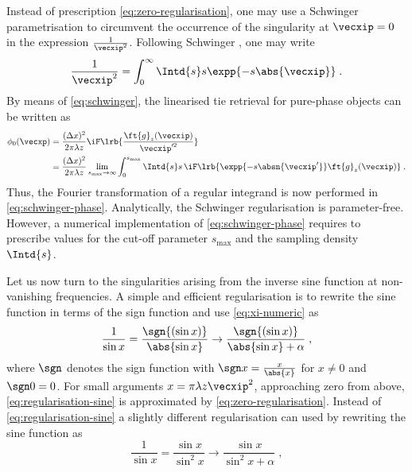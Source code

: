 \documentclass[
twoside,
openright,
titlepage,
numbers=noenddot,
headinclude,
fleqn,
a4paper,
footinclude=true,
cleardoublepage=empty,
abstractoff,
BCOR=5mm,
paper=a4,
fontsize=11pt,
british,ngerman,american,
]{scrreprt}
\begin{document}
Instead of prescription \eqref{eq:zero-regularisation}, one may use a
Schwinger parametrisation to circumvent the occurrence of the
singularity at $\vecxip=0$ in the expression $\frac{1}{\vecxip^2}$.
Following Schwinger \cite{Schwinger1992}, one may write
\begin{equation}
  \label{eq:schwinger}
  \frac{1}{\vecxip^2} = 
  \int_0^\infty\Intd{s} s \expp{-s\abs{\vecxip}} \;.
\end{equation}
By means of \cref{eq:schwinger}, the linearised \ac{tie} retrieval for
pure-phase objects can be written as
\begin{equation}
  \label{eq:schwinger-phase}
  \begin{split}
    \phi_0(\vecxp) 
    & = \frac{(\Delta x)^2}{2 \pi\lambda z} 
    \iF\lrb{\frac{\ft{g}_z(\vecxip)}{\vecxip'^2}}
    \\ & = \frac{(\Delta x)^2}{2 \pi\lambda z} 
    \lim_{s_\mathrm{max}\to\infty} \int_0^{s_\mathrm{max}} \Intd{s} s\,
    \iF\lrb{ \expp{-s\absn{\vecxip'}} \ft{g}_z(\vecxip) } \;.
  \end{split}
\end{equation}
Thus, the Fourier transformation of a regular integrand is now
performed in \cref{eq:schwinger-phase}.  Analytically, the Schwinger
regularisation is parameter-free.  However, a numerical implementation
of \cref{eq:schwinger-phase} requires to prescribe values for the
cut-off parameter $s_\mathrm{max}$ and the sampling density
$\Intd{s}$.

Let us now turn to the singularities arising from the inverse sine
function at non-vanishing frequencies.  A simple and efficient
regularisation is to rewrite the sine function in terms of the sign
function and use \cref{eq:xi-numeric} as
\begin{equation}
  \label{eq:regularisation-sine}
  \frac{1}{\sin x} = \frac{\sgn{(\sin x)}}{\abs{\sin x}} 
  \to  \frac{\sgn{(\sin x)}}{\abs{\sin x}+\alpha} \;,
\end{equation}
where $\sgn$ denotes the sign function with $\sgn x=\frac{x}{\abs{x}}$
for $x\neq 0$ and $\sgn0 = 0$.  For small arguments $x=\pi\lambda z
\vecxip^2$, approaching zero from above, \cref{eq:regularisation-sine}
is approximated by \cref{eq:zero-regularisation}.  Instead of
\cref{eq:regularisation-sine} a slightly different regularisation can
used by rewriting the sine function as
\begin{equation}
  \label{eq:regularisation-sine-2}
  \frac{1}{\sin x} = \frac{\sin x}{\sin^2 x} 
  \to  \frac{\sin x}{\sin^2 x + \alpha} \;,
\end{equation}
\end{document}
